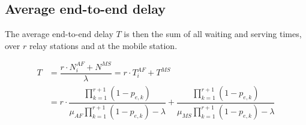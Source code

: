 \subsection{Average end-to-end delay}

The average end-to-end delay $T$ is then the sum of all waiting and serving times,
over $r$ relay stations and at the mobile station.

\begin{align*}
  T  &= \dfrac{r \cdot N_i^{AF} + N^{MS}}{\lambda} = r \cdot T_i^{AF} + T^{MS}  \\
  ~ &= r \cdot \dfrac{\prod\limits_{k=1}^{r+1} (1 - p_{e,k})}{\mu_{AF}\prod\limits_{k=1}^{r+1} (1 - p_{e,k}) -\lambda}
  + \dfrac{\prod\limits_{k=1}^{r+1} (1 - p_{e,k})}{\mu_{MS}\prod\limits_{k=1}^{r+1} (1 - p_{e,k}) -\lambda}
\end{align*}
